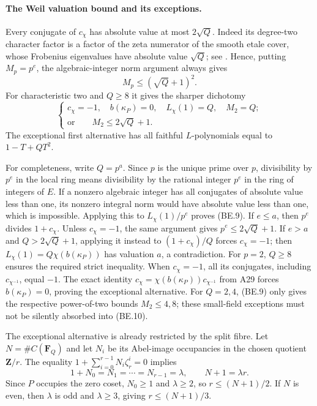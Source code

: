 \documentclass[11pt,a4paper]{article}
\begin{document}
\paragraph{The Weil valuation bound and its exceptions.}
Every conjugate of $c_\chi$ has absolute value at most
$2\sqrt Q$. Indeed its degree-two character factor is a
factor of the zeta numerator of the smooth etale cover,
whose Frobenius eigenvalues have absolute value $\sqrt Q$;
see \cite[Theorem~1.6]{WeilI}. Hence, putting $M_p=p^e$,
the algebraic-integer norm argument always gives
\[
                         M_p\le(\sqrt Q+1)^2.
 \tag{BE.9}
\]
For characteristic two and $Q\ge8$ it gives the sharper
dichotomy
\[
 \begin{cases}
 c_\chi=-1,\quad b(\kappa_P)=0,
                  \quad L_\chi(1)=Q,\quad M_2=Q;\\[2pt]
 \text{or}\qquad M_2\le2\sqrt Q+1.
 \end{cases}
 \tag{BE.10}
\]
The exceptional first alternative has all faithful
$L$-polynomials equal to $1-T+QT^2$.

For completeness, write $Q=p^a$.
Since $p$ is the unique prime over $p$, divisibility by
$p^e$ in the local ring means divisibility by the rational
integer $p^e$ in the ring of integers of $E$.
If a nonzero algebraic integer has all conjugates of
absolute value less than one, its nonzero integral norm
would have absolute value less than one, which is impossible.
Applying this to $L_\chi(1)/p^e$ proves (BE.9).
If $e\le a$, then $p^e$ divides $1+c_\chi$. Unless
$c_\chi=-1$, the same argument gives $p^e\le2\sqrt Q+1$.
If $e>a$ and $Q>2\sqrt Q+1$, applying it instead to
$(1+c_\chi)/Q$ forces $c_\chi=-1$; then
$L_\chi(1)=Q\chi(b(\kappa_P))$ has valuation $a$, a
contradiction. For $p=2$, $Q\ge8$ ensures the required
strict inequality. When $c_\chi=-1$, all its conjugates,
including $c_{\chi^{-1}}$, equal $-1$. The exact identity
$c_\chi=\chi(b(\kappa_P))c_{\chi^{-1}}$ from A29 forces
$b(\kappa_P)=0$, proving the exceptional alternative.
For $Q=2,4$, (BE.9) only gives the respective power-of-two
bounds $M_2\le4,8$; these small-field exceptions must not
be silently absorbed into (BE.10).

The exceptional alternative is already restricted by the
split fibre. Let $N=\#C(\mathbf F_Q)$ and let $N_i$ be its
Abel-image occupancies in the chosen quotient $\mathbf Z/r$.
The equality $1+\sum_{i=0}^{r-1}N_i\zeta_r^i=0$ implies
\[
 1+N_0=N_1=\cdots=N_{r-1}=\lambda,\qquad
 N+1=\lambda r.
 \tag{BE.11}
\]
Since $P$ occupies the zero coset, $N_0\ge1$ and
$\lambda\ge2$, so $r\le(N+1)/2$. If $N$ is even, then
$\lambda$ is odd and $\lambda\ge3$, giving
$r\le(N+1)/3$.
\end{document}

